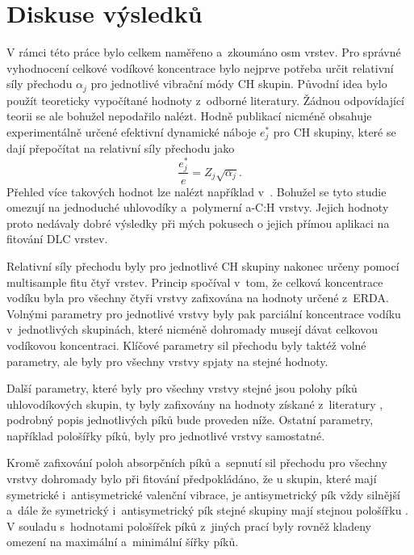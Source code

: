 \chapter{Diskuse výsledků}
\def\floatpagefraction{0.85}

V rámci této práce bylo celkem naměřeno a~zkoumáno osm vrstev. Pro správné vyhodnocení celkové vodíkové koncentrace bylo nejprve potřeba určit relativní síly přechodu $\alpha_j$ pro jednotlivé vibrační módy CH skupin. Původní idea bylo použít teoreticky vypočítané hodnoty z~odborné literatury. Žádnou odpovídající teorii se ale bohužel nepodařilo nalézt. Hodně publikací nicméně obsahuje experimentálně určené efektivní dynamické náboje $e_j^*$ pro CH skupiny, které se dají přepočítat na relativní síly přechodu jako \cite{sumrule2}
%
\begin{equation}
\frac{e_j^*}{e} = Z_j \sqrt{\alpha_j} \text{.}
\label{efch2str}
\end{equation}
%
Přehled více takových hodnot lze nalézt například v~\cite{Heitz1998}. Bohužel se tyto studie omezují na jednoduché uhlovodíky a~polymerní a-C:H vrstvy. Jejich hodnoty proto nedávaly dobré výsledky při mých pokusech o jejich přímou aplikaci na fitování DLC vrstev. 

Relativní síly přechodu byly pro jednotlivé CH skupiny nakonec určeny pomocí multi\-sample fitu čtyř vrstev. Princip spočíval v~tom, že celková koncentrace vodíku byla pro všechny čtyři vrstvy zafixována na hodnoty určené z~ERDA. Volnými parametry pro jednotlivé vrstvy byly pak parciální koncentrace vodíku v~jednotlivých skupinách, které nicméně dohromady musejí dávat celkovou vodíkovou koncentraci. Klíčové parametry sil přechodu byly taktéž volné parametry, ale byly pro všechny vrstvy spjaty na stejné hodnoty. 

Další parametry, které byly pro všechny vrstvy stejné jsou polohy píků uhlovodíkových skupin, ty byly zafixovány na hodnoty získané z~literatury \cite{Robertson2002, Dischler1983, Ristein1998, Zajickova2011}, podrobný popis jednotlivých píků bude proveden níže. Ostatní parametry, například pološířky píků, byly pro jednotlivé vrstvy samostatné.

Kromě zafixování poloh absorpčních píků a~sepnutí sil přechodu pro všechny vrstvy dohromady bylo při fitování předpokládáno, že
u skupin, které mají symetrické i~antisymetrické valenční vibrace, je antisymetrický pík vždy silnější a~dále  že symetrický i~antisymetrický pík stejné skupiny mají stejnou pološířku \cite{Heitz1998}. V souladu s~hodnotami pološířek píků z~jiných prací \cite{Dischler1983, Zajickova2011} byly rovněž kladeny omezení na maximální a~mi\-ni\-mální šířky píků.

